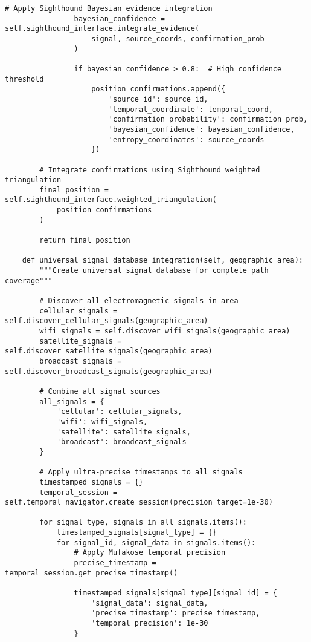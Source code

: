 \documentclass[12pt,a4paper]{article}
\begin{document}
\begin{lstlisting}[style=pythonstyle, caption=S-Entropy Compression Implementation for GPS]
                # Apply Sighthound Bayesian evidence integration
                bayesian_confidence = self.sighthound_interface.integrate_evidence(
                    signal, source_coords, confirmation_prob
                )
                
                if bayesian_confidence > 0.8:  # High confidence threshold
                    position_confirmations.append({
                        'source_id': source_id,
                        'temporal_coordinate': temporal_coord,
                        'confirmation_probability': confirmation_prob,
                        'bayesian_confidence': bayesian_confidence,
                        'entropy_coordinates': source_coords
                    })
        
        # Integrate confirmations using Sighthound weighted triangulation
        final_position = self.sighthound_interface.weighted_triangulation(
            position_confirmations
        )
        
        return final_position
    
    def universal_signal_database_integration(self, geographic_area):
        """Create universal signal database for complete path coverage"""
        
        # Discover all electromagnetic signals in area
        cellular_signals = self.discover_cellular_signals(geographic_area)
        wifi_signals = self.discover_wifi_signals(geographic_area)
        satellite_signals = self.discover_satellite_signals(geographic_area)
        broadcast_signals = self.discover_broadcast_signals(geographic_area)
        
        # Combine all signal sources
        all_signals = {
            'cellular': cellular_signals,
            'wifi': wifi_signals,
            'satellite': satellite_signals,
            'broadcast': broadcast_signals
        }
        
        # Apply ultra-precise timestamps to all signals
        timestamped_signals = {}
        temporal_session = self.temporal_navigator.create_session(precision_target=1e-30)
        
        for signal_type, signals in all_signals.items():
            timestamped_signals[signal_type] = {}
            for signal_id, signal_data in signals.items():
                # Apply Mufakose temporal precision
                precise_timestamp = temporal_session.get_precise_timestamp()
                
                timestamped_signals[signal_type][signal_id] = {
                    'signal_data': signal_data,
                    'precise_timestamp': precise_timestamp,
                    'temporal_precision': 1e-30
                }
        

\end{lstlisting}
\end{document}
